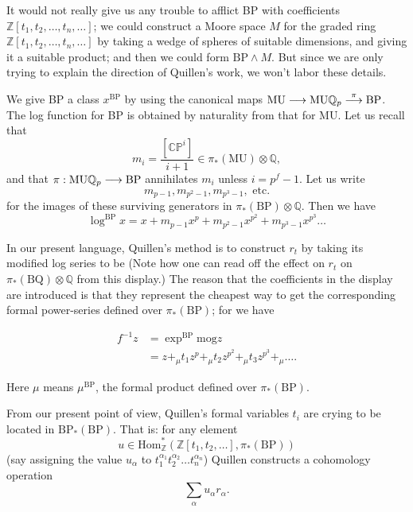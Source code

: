 \documentclass[../main]{subfiles}
\begin{document}
It would not really give us any trouble to afflict BP with coefficients $\mathbb Z[t_1, t_2, \ldots, t_n, \ldots]$; we could construct a Moore space $M$ for the graded ring $\mathbb Z[t_1, t_2, \ldots, t_n, \ldots]$ by taking a wedge of spheres of suitable dimensions, and giving it a suitable product; and then we could form $\mathrm{BP} \wedge M$. But since we are only trying to explain the direction of Quillen's work, we won't labor these details.

We give BP a class $x^{\mathrm{BP}}$ by using the canonical maps $\mathrm{MU} \overset{}{\longrightarrow} \mathrm{MU} \mathbb Q_p \overset{\pi}{\longrightarrow} \mathrm{BP}$. The log function for BP is obtained by naturality from that for MU. Let us recall that $$m_i = \frac {[\mathbb {CP}^i]} {i + 1} \in \pi_\ast(\mathrm{MU}) \otimes \mathbb Q,$$ and that $\pi : \mathrm{MU} \mathbb Q_p \overset{}{\longrightarrow} \mathrm{BP}$ annihilates $m_i$ unless $i = p^f - 1$. Let us write $$m_{p - 1}, m_{p^2 - 1}, m_{p^3 - 1}, \text { etc.}$$ for the images of these surviving generators in $\pi_\ast(\mathrm{BP}) \otimes \mathbb Q$. Then we have $$\log^{\mathrm{BP}} x = x + m_{p - 1} x^p + m_{p^2 - 1} x^{p^2} + m_{p^3 - 1} x^{p^3} \ldots$$ 

In our present language, Quillen's method is to construct $r_t$ by taking its modified log series to be 
(Note how one can read off the effect on $r_t$ on $\pi_\ast(\mathrm{BQ}) \otimes \mathbb Q$ from this display.) The reason that the coefficients in the display are introduced is that they represent the cheapest way to get the corresponding formal power-series defined over $\pi_\ast(\mathrm{BP})$; for we have 

\begin{align*}
f^{-1} z & = \exp^{\mathrm{BP}} \mathrm{mog} z \\ & = z +_\mu t_1 z^{p} +_\mu t_2 z^{p^2} +_\mu t_3 z^{p^3} +_\mu \ldots.
\end{align*}

Here $\mu$ means $\mu^{\mathrm{BP}}$, the formal product defined over $\pi_\ast(\mathrm{BP})$.

From our present point of view, Quillen's formal variables $t_i$ are crying to be located in $\mathrm{BP}_\ast(\mathrm{BP})$. That is: for any element $$u \in \mathrm{Hom}_{\mathbb Z}^\ast(\mathbb Z[t_1, t_2, \ldots], \pi_\ast(\mathrm {BP}))$$ (say assigning the value $u_\alpha$ to $t_1^{\alpha_1} t_2^{\alpha_2} \ldots t_n^{\alpha_n}$) Quillen constructs a cohomology operation $$\sum_\alpha u_\alpha r_\alpha.$$ 
\end{document}
